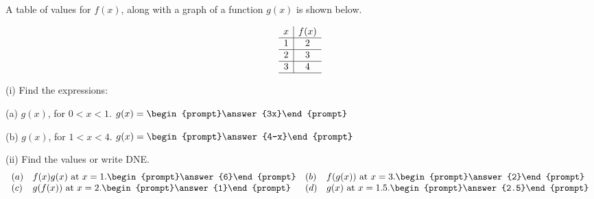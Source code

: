 \documentclass{ximera}
\author{Tom Dinitz and Nela Lakos}
\begin{document}
\begin{exercise}

A table of values for $f(x)$, along with a graph of a function $g(x)$ is shown below.

\[
\begin{array}{c|c}
x & f(x)\\ \hline
1 & 2 \\ \hline
2 & 3 \\ \hline
3 & 4 \\ \hline
\end{array}
\]
\begin{image}
\end{image}

(i) Find the expressions:

(a) $g(x)$, for $0<x<1$. $g(x)=\begin{prompt}\answer{3x}\end{prompt}$

(b) $g(x)$, for $1<x<4$. $g(x)=\begin{prompt}\answer{4-x}\end{prompt}$

(ii) Find the values or write DNE.
\[
\begin{array}{l l l l}
(a) & f(x)g(x) \text{ at } x=1. \begin{prompt}\answer{6}\end{prompt} &
(b) & f(g(x)) \text{ at } x=3. \begin{prompt}\answer{2}\end{prompt} \\

(c) & g(f(x)) \text{ at } x=2. \begin{prompt}\answer{1}\end{prompt} &
(d) & g(x) \text{ at } x=1.5. \begin{prompt}\answer{2.5}\end{prompt} \\


\end{array}\]
\end{exercise}
\end{document}
